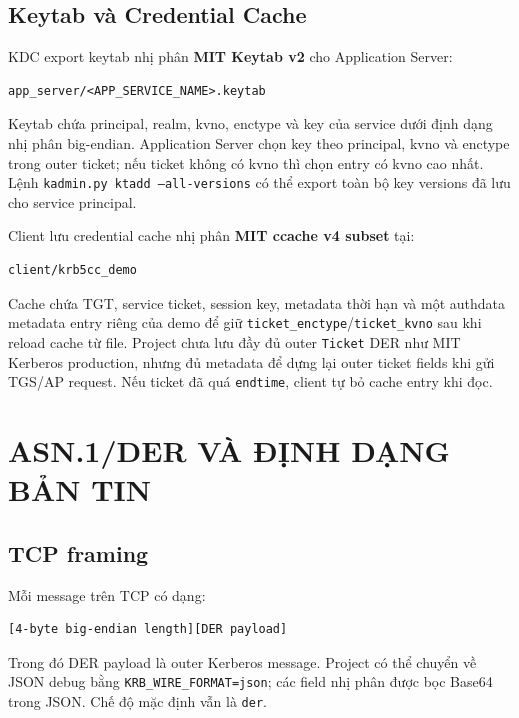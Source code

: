 \documentclass[12pt]{article}
\begin{document}
\subsection{Keytab và Credential Cache}

KDC export keytab nhị phân {\bf MIT Keytab v2} cho Application Server:

\begin{lstlisting}[style=textcode]
app_server/<APP_SERVICE_NAME>.keytab
\end{lstlisting}

Keytab chứa principal, realm, kvno, enctype và key của service dưới định dạng nhị phân big-endian. Application Server chọn key theo principal, kvno và enctype trong outer ticket; nếu ticket không có kvno thì chọn entry có kvno cao nhất. Lệnh \texttt{kadmin.py ktadd --all-versions} có thể export toàn bộ key versions đã lưu cho service principal.

Client lưu credential cache nhị phân {\bf MIT ccache v4 subset} tại:

\begin{lstlisting}[style=textcode]
client/krb5cc_demo
\end{lstlisting}

Cache chứa TGT, service ticket, session key, metadata thời hạn và một authdata metadata entry riêng của demo để giữ \texttt{ticket\_enctype}/\texttt{ticket\_kvno} sau khi reload cache từ file. Project chưa lưu đầy đủ outer \texttt{Ticket} DER như MIT Kerberos production, nhưng đủ metadata để dựng lại outer ticket fields khi gửi TGS/AP request. Nếu ticket đã quá \texttt{endtime}, client tự bỏ cache entry khi đọc.

\section{ASN.1/DER VÀ ĐỊNH DẠNG BẢN TIN}

\subsection{TCP framing}

Mỗi message trên TCP có dạng:

\begin{lstlisting}[style=textcode]
[4-byte big-endian length][DER payload]
\end{lstlisting}

Trong đó DER payload là outer Kerberos message. Project có thể chuyển về JSON debug bằng \texttt{KRB\_WIRE\_FORMAT=json}; các field nhị phân được bọc Base64 trong JSON. Chế độ mặc định vẫn là \texttt{der}.
\end{document}
